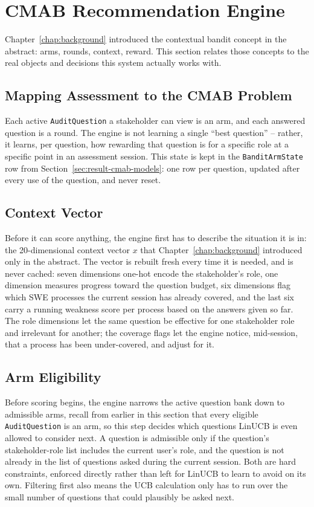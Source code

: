 \documentclass[a4paper, 12pt, oneside, openany, BCOR1cm,toc=chapterentrywithdots]{scrbook}
\begin{document}
\section{CMAB Recommendation Engine}
\label{sec:cmab-engine}

Chapter~\ref{chap:background} introduced the contextual bandit concept in the abstract: arms,
rounds, context, reward. This section relates those concepts to the real objects and decisions
this system actually works with.

\subsection{Mapping Assessment to the CMAB Problem}

Each active \texttt{AuditQuestion} a stakeholder can view is an arm, and each answered question
is a round. The engine is not learning a single ``best question'' -- rather, it learns, per
question, how rewarding that question is for a specific role at a specific point in an assessment
session. This state is kept in the \texttt{BanditArmState} row from
Section~\ref{sec:result-cmab-models}: one row per question, updated after every use of the
question, and never reset.

\subsection{Context Vector}

Before it can score anything, the engine first has to describe the situation it is in: the
20-dimensional context vector $x$ that Chapter~\ref{chap:background} introduced only in the
abstract. The vector is rebuilt fresh every time it is needed, and is never cached: seven
dimensions one-hot encode the stakeholder's role, one dimension measures progress toward the
question budget, six dimensions flag which SWE processes the current session has already
covered, and the last six carry a running weakness score per process based on the answers given
so far. The role dimensions let the same
question be effective for one stakeholder role and irrelevant for another; the coverage flags let
the engine notice, mid-session, that a process has been under-covered, and adjust for it.

\subsection{Arm Eligibility}

Before scoring begins, the engine narrows the active question bank down to admissible arms, recall from earlier in this section that every eligible \texttt{AuditQuestion} is an arm, so this
step decides which questions LinUCB is even allowed to consider next. A question is
admissible only if the question's stakeholder-role list includes the current user's role, and the
question is not already in the list of questions asked during the current session. Both are hard constraints,
enforced directly rather than left for LinUCB to learn to avoid on its own. Filtering first also
means the UCB calculation only has to run over the small number of questions that could
plausibly be asked next.
\end{document}
